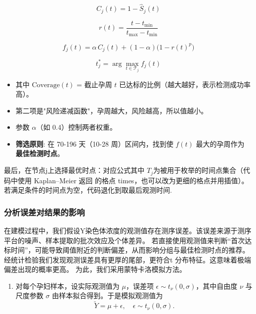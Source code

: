 \documentclass[withoutpreface,notoc]{cumcmthesis}
\begin{document}
	\begin{equation*}
		C_j(t) = 1 - \hat S_j(t)
	\end{equation*}



	\begin{equation*}
		r(t) = \frac{t-t_{\min}}{t_{\max}-t_{\min}}
	\end{equation*}

	\begin{equation*}
		f_j(t)=\alpha\, C_j(t) + (1-\alpha)\big(1-r(t)^p\big)
	\end{equation*}
	
	\begin{equation*}
		t_j^* = \arg\max_{t \in \mathcal{T}_j} f_j(t)
	\end{equation*}


\begin{itemize}
    \item 其中 $\text{Coverage}(t)$ = 截止孕周 $t$ 已达标的比例（越大越好，表示检测成功率高）。
    \item 第二项是"风险递减函数"，孕周越大，风险越高，所以值越小。
    \item 参数 $\alpha$（如 0.4）控制两者权重。
    \item \textbf{筛选原则}: 在 70-196 天（10-28 周）区间内，找到使 $f(t)$ 最大的孕周作为 \textbf{最佳检测时点}。
\end{itemize}


最后，在节点j上选择最优时点：{对应公式}其中 $T_j$为被用于枚举的时间点集合（代码中使用 Kaplan–Meier 返回
的格点 times，也可以改为更细的格点并用插值）。若满足条件的时间点为空，代码退化到取最后观测时间.





\subsubsection{分析误差对结果的影响}

在建模过程中，我们假设Y染色体浓度的观测值存在测序误差。该误差来源于测序平台的噪声、样本提取的批次效应及个体差异。
若直接使用观测值来判断“首次达标时间”，可能导致阈值附近的判断偏差，从而影响分组与最佳检测时点的推荐。
经统计检验我们发现观测误差具有更厚的尾部，更符合t 分布特征。这意味着极端偏差出现的概率更高。
为此，我们采用蒙特卡洛模拟方法。

\begin{enumerate}
    \item 对每个孕妇样本，设实际观测值为 $\mu$，误差项 $\epsilon \sim t_\nu(0, \sigma)$，其中自由度 $\nu$ 与尺度参数 $\sigma$ 由样本拟合得到。于是模拟观测值为
    \[
    \tilde{Y} = \mu + \epsilon, \quad \epsilon \sim t_\nu(0, \sigma).
    \]
\end{enumerate}
\end{document}
